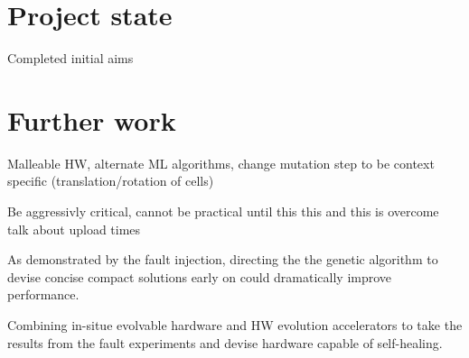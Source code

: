 \section{Project state}
Completed initial aims

\section{Further work}
Malleable HW, alternate ML algorithms, change mutation step to be context specific (translation/rotation
of cells)

Be aggressivly critical, cannot be practical until this this and this is overcome
talk about upload times

As demonstrated by the fault injection, directing the the genetic algorithm
to devise concise compact solutions early on could dramatically improve performance.

Combining in-situe evolvable hardware and HW evolution accelerators
to take the results from the fault experiments and devise hardware
capable of self-healing.
